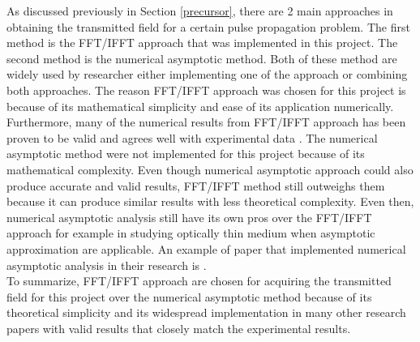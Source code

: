 As discussed previously in Section \ref{precursor}, there are 2 main approaches in obtaining the transmitted field for a certain pulse propagation problem. The first method is the FFT/IFFT approach that was implemented in this project. The second method is the numerical asymptotic method. Both of these method are widely used by researcher either implementing one of the approach or combining both approaches. The reason FFT/IFFT approach was chosen for this project is because of its mathematical simplicity and ease of its application numerically. Furthermore, many of the numerical results from FFT/IFFT approach has been proven to be valid and agrees well with experimental data \cite{Chen2010, Macke2013, MacKe2009, Oughstun2010, Wei2009, Jeong2008, Jeong2010}. The numerical asymptotic method were not implemented for this project because of its mathematical complexity. Even though numerical asymptotic approach could also produce accurate and valid results, FFT/IFFT method still outweighs them because it can produce similar results with less theoretical complexity. Even then, numerical asymptotic analysis still have its own pros over the FFT/IFFT approach for example in studying optically thin medium when asymptotic approximation are applicable. An example of paper that implemented numerical asymptotic analysis in their research is \cite{Jeong2009}.\\

To summarize, FFT/IFFT approach are chosen for acquiring the transmitted field for this project over the numerical asymptotic method because of its theoretical simplicity and its widespread implementation in many other research papers with valid results that closely match the experimental results.
